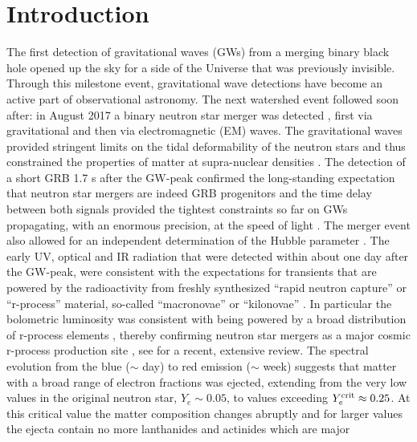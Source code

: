 \documentclass[useAMS,usenatbib]{iopart}
\begin{document}
\section{Introduction}
The first detection of gravitational waves (GWs) from a merging binary black hole \cite{abbott16a} 
opened up the sky for a side of the Universe that was previously invisible.
Through this milestone event, gravitational wave detections have become an active part of observational 
astronomy. The next watershed event followed soon after: in August 2017  a 
binary neutron star merger was detected \cite{abbott17b,abbott17c}, first via gravitational and then via
electromagnetic (EM) waves.
The gravitational waves provided stringent limits on the tidal deformability of the neutron stars and thus
constrained the properties of matter at supra-nuclear densities \cite{abbott17b}. The detection 
of a short GRB 1.7 s after the  GW-peak \cite{abbott17d,goldstein17,savchenko17,troja17,hallinan17,kasliwal17,mooley18} 
confirmed the long-standing expectation \cite{eichler89} that neutron star mergers are indeed
GRB progenitors and the time delay between both signals provided the tightest constraints so far on 
GWs propagating, with an enormous precision, at the speed of light \cite{abbott17d}. The merger event also allowed for an 
independent determination of the Hubble parameter \cite{abbott17a}.
The early UV, optical and IR radiation that were detected within about one day after the GW-peak,
were consistent with the expectations for transients that are powered by the radioactivity from freshly
synthesized ``rapid neutron capture'' or ``r-process'' material, so-called ``macronovae'' \cite{kulkarni05} or ``kilonovae'' \cite{metzger10b}. 
In particular the bolometric luminosity was consistent with being powered by a broad distribution  of r-process elements 
\cite{rosswog18a,metzger19a}, thereby confirming neutron star mergers as a major
cosmic r-process production site \cite{lattimer74,lattimer77,eichler89,rosswog99,freiburghaus99b},
see \cite{cowan20} for a recent, extensive review.
The spectral evolution from the blue ($\sim$ day)  to red emission ($\sim$ week) 
suggests that matter with a broad range of electron fractions was ejected, extending from the very low values
in the original neutron star, $Y_e\sim0.05$, to values exceeding $Y_e^{\rm crit}\approx 0.25 $. 
At this critical value the matter composition changes abruptly \cite{korobkin12a,lippuner15,kasliwal19} 
and for larger values the ejecta contain no more lanthanides and actinides which are major
\end{document}
